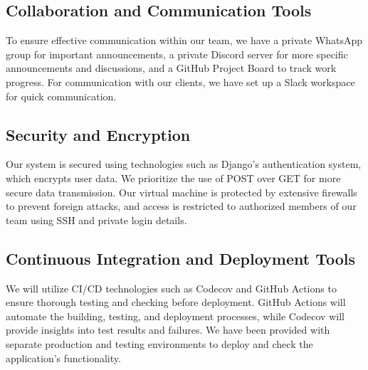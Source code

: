 \documentclass[12pt]{article}
\begin{document}
\subsection{Collaboration and Communication Tools}
To ensure effective communication within our team, we have a private WhatsApp group for important announcements, a private Discord server for more specific announcements and discussions, and a GitHub Project Board to track work progress. For communication with our clients, we have set up a Slack workspace for quick communication.

\subsection{Security and Encryption}
Our system is secured using technologies such as Django's authentication system, which encrypts user data. We prioritize the use of POST over GET for more secure data transmission. Our virtual machine is protected by extensive firewalls to prevent foreign attacks, and access is restricted to authorized members of our team using SSH and private login details.

\subsection{Continuous Integration and Deployment Tools}
We will utilize CI/CD technologies such as Codecov and GitHub Actions to ensure thorough testing and checking before deployment. GitHub Actions will automate the building, testing, and deployment processes, while Codecov will provide insights into test results and failures. We have been provided with separate production and testing environments to deploy and check the application's functionality.

\newpage
\end{document}
